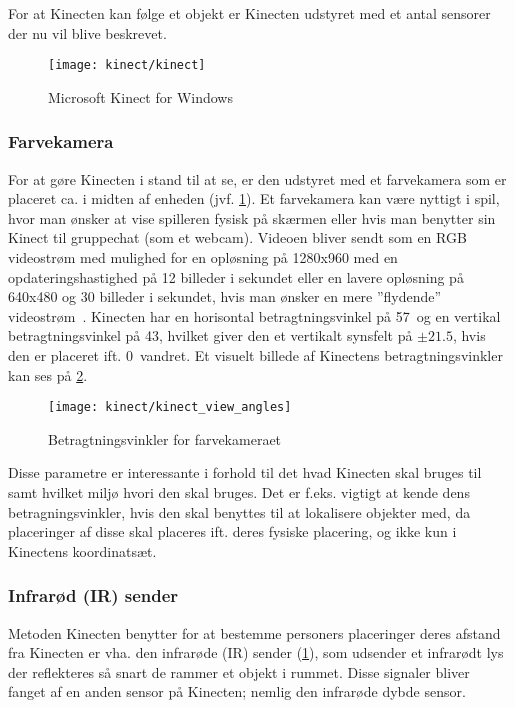 For at Kinecten kan følge et objekt er Kinecten udstyret med et antal sensorer der nu vil blive beskrevet.

\begin{figure}
\centering
\texttt{[image: kinect/kinect]}
\caption{Microsoft Kinect for Windows}
\label{kinect:opbygning}
\end{figure}

\subsubsection{Farvekamera}
For at gøre Kinecten i stand til at se, er den udstyret med et farvekamera som er placeret ca. i midten af enheden (jvf. \cref{kinect:opbygning}).
Et farvekamera kan være nyttigt i spil, hvor man ønsker at vise spilleren fysisk på skærmen eller hvis man benytter sin Kinect til gruppechat (som et webcam).
Videoen bliver sendt som en RGB videostrøm med mulighed for en opløsning på 1280x960 med en opdateringshastighed på 12 billeder i sekundet eller en lavere opløsning på 640x480 og 30 billeder i sekundet, hvis man ønsker en mere ”flydende” videostrøm~\cite{kinectForWindowsFeatures}.
Kinecten har en horisontal betragtningsvinkel på 57\degree~og en vertikal betragtningsvinkel på 43\degree, hvilket giver den et vertikalt synsfelt på $\pm 21.5$\degree, hvis den er placeret ift. 0\degree~vandret.
Et visuelt billede af Kinectens betragtningsvinkler kan ses på \cref{kinect:vinkler}.

\begin{figure}
\centering
\texttt{[image: kinect/kinect\_view\_angles]}
\caption{Betragtningsvinkler for farvekameraet}
\label{kinect:vinkler}
\end{figure}

Disse parametre er interessante i forhold til det hvad Kinecten skal bruges til samt hvilket miljø hvori den skal bruges. Det er f.eks. vigtigt at kende dens betragningsvinkler, hvis den skal benyttes til at lokalisere objekter med, da placeringer af disse skal placeres ift. deres fysiske placering, og ikke kun i Kinectens koordinatsæt.

\subsubsection{Infrarød (IR) sender}
Metoden Kinecten benytter for at bestemme personers placeringer deres afstand fra Kinecten er vha. den infrarøde (IR) sender (\cref{kinect:opbygning}), som udsender et infrarødt lys der reflekteres så snart de rammer et objekt i rummet. 
Disse signaler bliver fanget af en anden sensor på Kinecten; nemlig den infrarøde dybde sensor.

